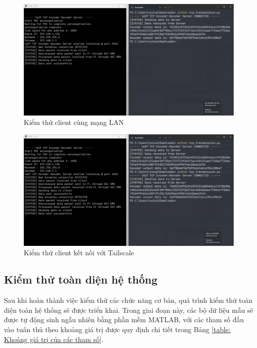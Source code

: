 \documentclass[../DoAn.tex]{subfiles}
\begin{document}
\begin{figure}[H]
    \centering
    \includegraphics[width=\textwidth, height=0.4\textheight, keepaspectratio]{Hinhve/Chuong 4/lan.png}
    \caption{Kiểm thử client cùng mạng LAN}
    \label{fig:Kiểm thử client cùng mạng LAN}
\end{figure}

\begin{figure}[H]
    \centering
    \includegraphics[width=\textwidth, height=0.4\textheight, keepaspectratio]{Hinhve/Chuong 4/tailscale.png}
    \caption{Kiểm thử client kết nối với Tailscale}
    \label{fig:Kiểm thử client kết nối với Tailscale}
\end{figure}

\subsection{Kiểm thử toàn diện hệ thống}
\label{subsection:Kiểm thử toàn diện hệ thống}

Sau khi hoàn thành việc kiểm thử các chức năng cơ bản, quá trình kiểm thử toàn diện toàn hệ thống sẽ được triển khai. Trong giai đoạn này, các bộ dữ liệu mẫu sẽ được tự động sinh ngẫu nhiên bằng phần mềm MATLAB, với các tham số đầu vào tuân thủ theo khoảng giá trị được quy định chi tiết trong Bảng \ref{table: Khoảng giá trị của các tham số}.
\end{document}

